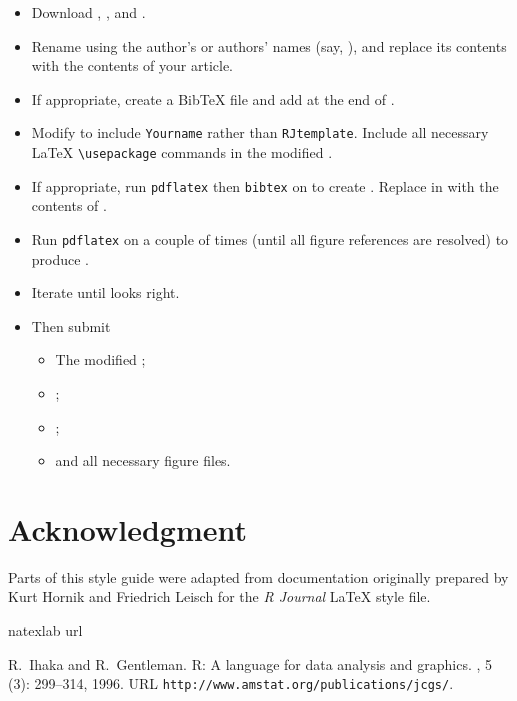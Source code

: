 \begin{itemize}

\item Download , ,
and .

\item Rename  using the author's or authors' names
(say, ), and replace its
contents with the contents of your article.

\item If appropriate, create a  BibTeX file and add
\verb|| at the end of .

\item Modify  to include {\tt Yourname} rather
than {\tt RJtemplate}. Include all necessary \LaTeX{} \verb|\usepackage|
commands in the modified .

\item If appropriate, run {\tt pdflatex} then
 {\tt bibtex} on 
to create . Replace
\verb||
in  with
the contents of .

\item Run {\tt pdflatex} on  a couple of times
(until all figure references are resolved) to produce .

\item Iterate until  looks right.

\item Then submit
  \begin{itemize}
  \item The modified ;
  \item {};
  \item {};
  \item and all necessary figure files.
  \end{itemize}
\end{itemize}

\section{Acknowledgment}

Parts of this style guide were adapted from documentation originally
prepared by Kurt Hornik and Friedrich Leisch for the \emph{R Journal}
\LaTeX{} style file.

\begin{thebibliography}{1}
\expandafter\ifx\csname natexlab\endcsname\relax\def\natexlab#1{#1}\fi
\expandafter\ifx\csname url\endcsname\relax
  \def\url#1{{\tt #1}}\fi

R.~Ihaka and R.~Gentleman.
\newblock R: A language for data analysis and graphics.
, 5
  (3): 299--314, 1996.
\newblock URL \url{http://www.amstat.org/publications/jcgs/}.

\end{thebibliography}



